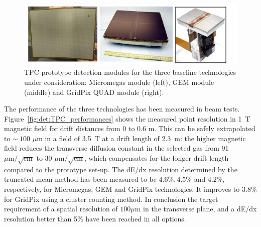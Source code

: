 \begin{figure}[t!]
\centering
\includegraphics[width=1.0\hsize]{Detector/fig/TPC_prototypes.jpg}
\caption{TPC prototype detection modules for the three baseline technologies under consideration: Micromegas module (left), GEM module (middle) and GridPix QUAD module (right).}
\label{fig:det:TPC_prototypes}
\end{figure}

The performance of the three technologies has been measured in beam tests. Figure~\ref{fig:det:TPC_performances} shows the measured point resolution in 1~T magnetic field for drift distances from 0 to 0.6 m. This can be safely extrapolated to $\sim~100$ $\mu$m in a field of 3.5~T at a drift length of 2.3~m: the higher magnetic field reduces the transverse diffusion constant in the selected gas from 91~$\mu \mathrm{m} / \sqrt{\mathrm{cm}}$ to 30 $\mu \mathrm{m} / \sqrt{\mathrm{cm}}$, which compensates for the longer drift length compared to the prototype set-up. The dE/dx resolution determined by the truncated mean method has been measured to be $4.6\%, 4.5\%$ and $4.2\%$, respectively, for Micromegas, GEM and GridPix technologies. It improves to $3.8\%$ for GridPix using a cluster counting method. In conclusion the target requirement of a spatial resolution of $100 \mu$m in the transverse plane, and a dE/dx resolution better than 5\% have been reached in all options.   
